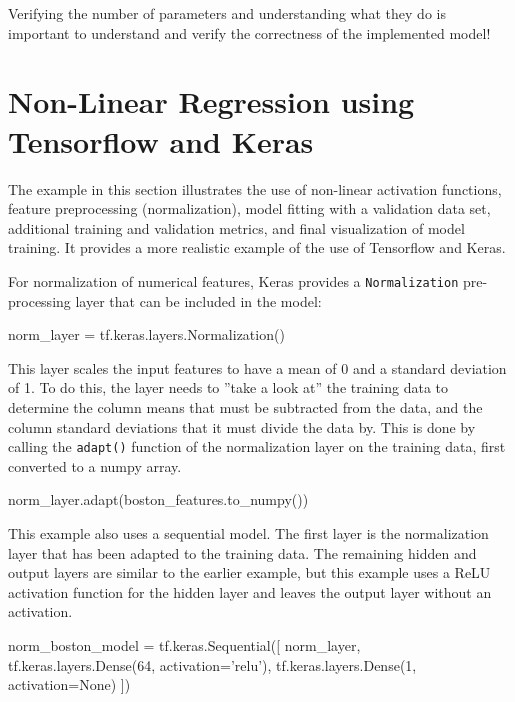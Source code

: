 \begin{tcolorbox}[colback=alert]
Verifying the number of parameters and understanding what they do is important to understand and verify the correctness of the implemented model!
\end{tcolorbox}

\section{Non-Linear Regression using Tensorflow and Keras}

The example in this section illustrates the use of non-linear activation functions, feature preprocessing (normalization), model fitting with a validation data set, additional training and validation metrics, and final visualization of model training. It provides a more realistic example of the use of Tensorflow and Keras. 

For normalization of numerical features, Keras provides a \texttt{Normalization} pre-processing layer that can be included in the model:

\begin{pythoncode}
norm_layer = tf.keras.layers.Normalization()
\end{pythoncode}

This layer scales the input features to have a mean of 0 and a standard deviation of 1. To do this, the layer needs to ''take a look at'' the training data to determine the column means that must be subtracted from the data, and the column standard deviations that it must divide the data by. This is done by calling the \texttt{adapt()} function of the normalization layer on the training data, first converted to a numpy array.

\begin{pythoncode}
norm_layer.adapt(boston_features.to_numpy())
\end{pythoncode}

This example also uses a sequential model. The first layer is the normalization layer that has been adapted to the training data. The remaining hidden and output layers are similar to the earlier example, but this example uses a ReLU activation function for the hidden layer and leaves the output layer without an activation.

\begin{samepage}
\begin{pythoncode}
norm_boston_model = tf.keras.Sequential([
  norm_layer,
  tf.keras.layers.Dense(64, activation='relu'),
  tf.keras.layers.Dense(1, activation=None)
])
\end{pythoncode}
\end{samepage}

